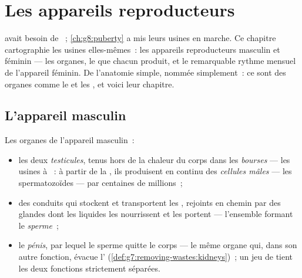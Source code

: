 \chapter{Les appareils reproducteurs}\label{ch:g8:reproductive-systems}

 avait besoin de ~;
\cref{ch:g8:puberty} a mis leurs usines en marche. Ce chapitre
cartographie les usines elles-mêmes~: les appareils reproducteurs
masculin et féminin --- les organes, le  que chacun produit,
et le remarquable rythme mensuel de l'appareil féminin. De
l'anatomie simple, nommée simplement~: ce sont des organes comme le
 et les , et voici leur chapitre.

\section{L'appareil masculin}

\begin{definition}\label{def:g8:reproductive-systems:male}
Les organes de l'appareil masculin~:
\begin{itemize}
  \item les deux \emph{testicules}, tenus hors de
        la chaleur du corps dans les \emph{bourses} --- les usines à
        ~: à partir de la , ils produisent en continu
        des \emph{cellules mâles} --- les
        spermatozoïdes --- par centaines de millions~;
  \item des conduits qui stockent et transportent les 
        , rejoints en chemin par des glandes dont les liquides
        les nourrissent et les portent --- l'ensemble formant le
        \emph{sperme}~;
  \item le \emph{pénis}, par lequel le sperme quitte le
        corps --- le même organe qui, dans son autre fonction, évacue
        l' (\cref{def:g7:removing-wastes:kidneys})~; un jeu de
         tient les deux fonctions strictement séparées.
\end{itemize}
\end{definition}

